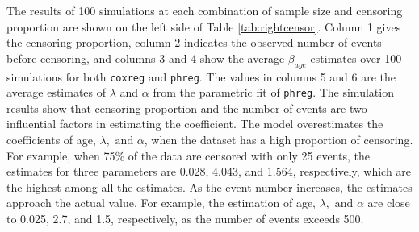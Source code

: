 The results of 100 simulations at each combination of sample size and censoring proportion are shown on the left side of Table \ref{tab:rightcensor}. Column 1 gives the censoring proportion, column 2 indicates the observed number of events before censoring, and columns 3 and 4 show the average $\beta_{age}$ estimates over 100 simulations for both {\tt coxreg} and {\tt phreg}. The values in columns 5 and 6 are the average estimates of $\lambda$ and $\alpha$ from the parametric fit of {\tt phreg}. The simulation results show that censoring proportion and the number of events are two influential factors in estimating the coefficient. The model overestimates the coefficients of age, $\lambda, \text{ and } \alpha$, when the dataset has a high proportion of censoring. For example, when 75\% of the data are censored with only 25 events, the estimates for three parameters are 0.028, 4.043, and 1.564, respectively, which are the highest among all the estimates. As the event number increases, the estimates approach the actual value. For example, the estimation of age, $\lambda, \text{ and } \alpha$ are close to 0.025, 2.7, and 1.5, respectively, as the number of events exceeds 500.


